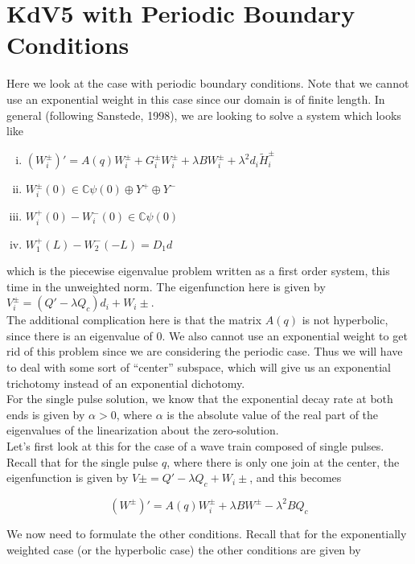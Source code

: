 \documentclass[12pt]{article}
\def\C{{\mathbb C}}
\begin{document}
\section*{KdV5 with Periodic Boundary Conditions}

Here we look at the case with periodic boundary conditions. Note that we cannot use an exponential weight in this case since our domain is of finite length. In general (following Sanstede, 1998), we are looking to solve a system which looks like 
\begin{enumerate}[(i)]
\item $(W_i^\pm)' = A(q) W_i^\pm + G_i^\pm W_i^\pm + \lambda B W_i^\pm + \lambda^2 d_i \tilde{H}_i^\pm$
\item $W_i^\pm(0) \in \C \psi(0) \oplus Y^+ \oplus Y^-$
\item $W_i^+(0) - W_i^-(0) \in \C \psi(0) $
\item $W_1^+(L) - W_2^-(-L) = D_1 d $
\end{enumerate}

which is the piecewise eigenvalue problem written as a first order system, this time in the unweighted norm. The eigenfunction here is given by $V_i^\pm = (Q' - \lambda Q_c)d_i + W_i\pm$.\\

The additional complication here is that the matrix $A(q)$ is not hyperbolic, since there is an eigenvalue of 0. We also cannot use an exponential weight to get rid of this problem since we are considering the periodic case. Thus we will have to deal with some sort of ``center'' subspace, which will give us an exponential trichotomy instead of an exponential dichotomy.\\

For the single pulse solution, we know that the exponential decay rate at both ends is given by $\alpha > 0$, where $\alpha$ is the absolute value of the real part of the eigenvalues of the linearization about the zero-solution.\\

Let's first look at this for the case of a wave train composed of single pulses. Recall that for the single pulse $q$, where there is only one join at the center, the eigenfunction is given by $V\pm = Q' - \lambda Q_c + W_i\pm$, and this becomes

\[
(W^\pm)' = A(q) W_i^\pm + \lambda B W^\pm - \lambda^2 B Q_c
\]

We now need to formulate the other conditions. Recall that for the exponentially weighted case (or the hyperbolic case) the other conditions are given by
\end{document}
